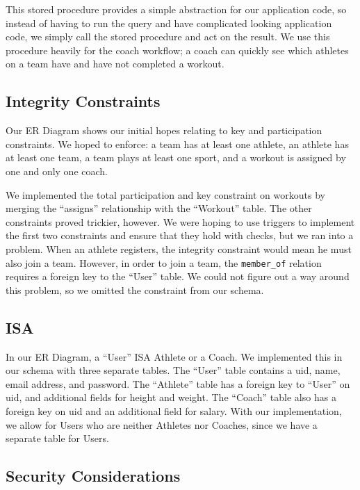 \documentclass{article}
\begin{document}
This stored procedure provides a simple abstraction for our application code,
so instead of having to run the query and have complicated looking application code,
we simply call the stored procedure and act on the result. We use this 
procedure heavily for the coach workflow; a coach can quickly see which athletes
on a team have and have not completed a workout.

\subsection*{Integrity Constraints}

Our ER Diagram shows our initial hopes relating to key and participation constraints. 
We hoped to enforce: a team has at least one athlete, an athlete has at least one team,
a team plays at least one sport, and a workout is assigned by one and only one coach. 

We implemented the total participation and key constraint on workouts by merging the 
``assigns'' relationship with the ``Workout'' table. The other constraints proved 
trickier, however. We were hoping to use triggers to implement the first two 
constraints and ensure that they hold with checks, but we ran into a problem. 
When an athlete registers, the integrity constraint would mean he must also join 
a team. However, in order to join a team, the \verb,member_of, relation requires a 
foreign key to the ``User'' table. We could not figure out a way around this problem,
so we omitted the constraint from our schema. 

\subsection*{ISA}

In our ER Diagram, a ``User'' ISA Athlete or a Coach. We implemented this in our
schema with three separate tables. The ``User'' table contains a uid, name,
email address, and password. The ``Athlete'' table has a foreign key to ``User''
on uid, and additional fields for height and weight. The ``Coach'' table also
has a foreign key on uid and an additional field for salary. With our implementation,
we allow for Users who are neither Athletes nor Coaches, since we have a separate
table for Users.

\subsection*{Security Considerations}
\end{document}
